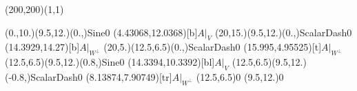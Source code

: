 \unitlength=1bp%

\begin{feynartspicture}(200,200)(1,1)

\FADiagram{}
\FAProp(0.,10.)(9.5,12.)(0.,){Sine}{0}
\FALabel(4.43068,12.0368)[b]{$A|_V$}
\FAProp(20,15.)(9.5,12.)(0.,){ScalarDash}{0}
\FALabel(14.3929,14.27)[b]{$A|_{W^\perp}$}
\FAProp(20,5.)(12.5,6.5)(0.,){ScalarDash}{0}
\FALabel(15.995,4.95525)[t]{$A|_{W^\perp}$}
\FAProp(12.5,6.5)(9.5,12.)(0.8,){Sine}{0}
\FALabel(14.3394,10.3392)[bl]{$A|_V$}
\FAProp(12.5,6.5)(9.5,12.)(-0.8,){ScalarDash}{0}
\FALabel(8.13874,7.90749)[tr]{$A|_{W^\perp}$}
\FAVert(12.5,6.5){0}
\FAVert(9.5,12.){0}
\end{feynartspicture}


